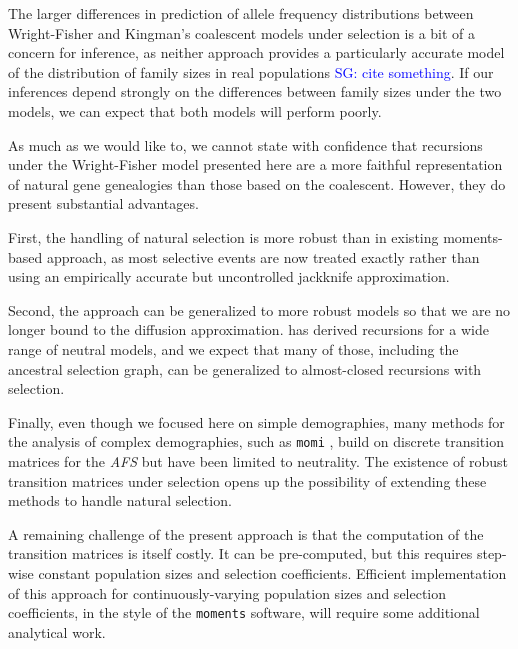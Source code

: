 \documentclass[9pt,twocolumn,twoside,lineno]{gsajnl}
\newcommand{\sgcomment}[1]{\textcolor{blue}{SG: #1}}
\begin{document}
The larger differences in prediction of allele frequency distributions between Wright-Fisher and Kingman's 
coalescent models under selection is a bit of a concern for inference, as neither approach provides 
a particularly accurate model of the distribution of family sizes in real populations \sgcomment{cite something}.
If our inferences depend strongly on the differences between family sizes under the two models, 
we can expect that both models will perform poorly. 

As much as we would like to, we cannot state with confidence that recursions under the Wright-Fisher
model presented here are a more faithful representation of natural gene genealogies than those based on 
the coalescent. However, they do present substantial advantages. 

First, the handling of natural selection is more robust than in existing moments-based approach, as most selective
events are now treated exactly rather than using an empirically accurate but uncontrolled jackknife approximation. 

Second, the approach can be generalized to more robust models so that we are no longer bound to the diffusion approximation. 
\cite{Lessard2010} has derived recursions for a wide range of neutral models, and we expect that many of those,
including the ancestral selection graph, can be generalized to almost-closed recursions with selection. 

Finally, even though we focused here on simple demographies, many methods for the analysis of complex demographies, 
such as \texttt{momi} \citep{KammEtAl2017}, build on discrete transition matrices for the \textit{AFS} but have been limited to neutrality.
 The existence of robust transition matrices 
under selection opens up the possibility of extending these methods to handle natural selection.

A remaining challenge of the present approach is that the computation of the transition matrices is itself costly. 
It can be pre-computed, but this requires step-wise constant population sizes 
and selection coefficients. Efficient implementation of this approach for continuously-varying population
sizes and selection coefficients, in the style of the \texttt{moments} software, will require some additional analytical work.


\end{document}
